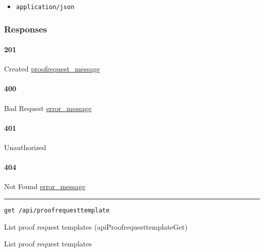 \begin{itemize}
\tightlist
\item
  \texttt{application/json}
\end{itemize}

\hypertarget{responses-172}{%
\subsubsection{Responses}\label{responses-172}}

\hypertarget{section-554}{%
\paragraph{201}\label{section-554}}

Created \protect\hyperlink{proofrequest_message}{proofrequest\_message}

\hypertarget{section-555}{%
\paragraph{400}\label{section-555}}

Bad Request \protect\hyperlink{error_message}{error\_message}

\hypertarget{section-556}{%
\paragraph{401}\label{section-556}}

Unauthorized \protect\hyperlink{}{}

\hypertarget{section-557}{%
\paragraph{404}\label{section-557}}

Not Found \protect\hyperlink{error_message}{error\_message}

\begin{center}\rule{0.5\linewidth}{\linethickness}\end{center}

\protect\hypertarget{apiProofrequesttemplateGet}{}{}

\begin{verbatim}
get /api/proofrequesttemplate
\end{verbatim}

List proof request templates ({apiProofrequesttemplateGet})

List proof request templates

